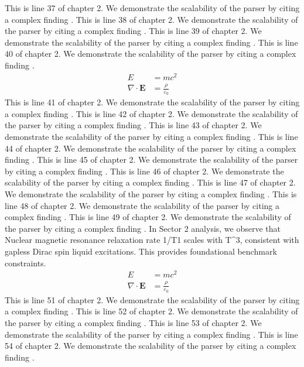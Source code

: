 This is line 37 of chapter 2. We demonstrate the scalability of the parser by citing a complex finding \cite{ref2_37}.
This is line 38 of chapter 2. We demonstrate the scalability of the parser by citing a complex finding \cite{ref2_38}.
This is line 39 of chapter 2. We demonstrate the scalability of the parser by citing a complex finding \cite{ref2_39}.
This is line 40 of chapter 2. We demonstrate the scalability of the parser by citing a complex finding \cite{ref2_40}.
\begin{align*}
  E &= mc^2 \\
  \nabla \cdot \mathbf{E} &= \frac{\rho}{\varepsilon_0}
\end{align*}
This is line 41 of chapter 2. We demonstrate the scalability of the parser by citing a complex finding \cite{ref2_41}.
This is line 42 of chapter 2. We demonstrate the scalability of the parser by citing a complex finding \cite{ref2_42}.
This is line 43 of chapter 2. We demonstrate the scalability of the parser by citing a complex finding \cite{ref2_43}.
This is line 44 of chapter 2. We demonstrate the scalability of the parser by citing a complex finding \cite{ref2_44}.
This is line 45 of chapter 2. We demonstrate the scalability of the parser by citing a complex finding \cite{ref2_45}.
This is line 46 of chapter 2. We demonstrate the scalability of the parser by citing a complex finding \cite{ref2_46}.
This is line 47 of chapter 2. We demonstrate the scalability of the parser by citing a complex finding \cite{ref2_47}.
This is line 48 of chapter 2. We demonstrate the scalability of the parser by citing a complex finding \cite{ref2_48}.
This is line 49 of chapter 2. We demonstrate the scalability of the parser by citing a complex finding \cite{ref2_49}.
In Sector 2 analysis, we observe that Nuclear magnetic resonance relaxation rate 1/T1 scales with T^3, consistent with gapless Dirac spin liquid excitations. This provides foundational benchmark constraints.
\begin{align*}
  E &= mc^2 \\
  \nabla \cdot \mathbf{E} &= \frac{\rho}{\varepsilon_0}
\end{align*}
This is line 51 of chapter 2. We demonstrate the scalability of the parser by citing a complex finding \cite{ref2_51}.
This is line 52 of chapter 2. We demonstrate the scalability of the parser by citing a complex finding \cite{ref2_52}.
This is line 53 of chapter 2. We demonstrate the scalability of the parser by citing a complex finding \cite{ref2_53}.
This is line 54 of chapter 2. We demonstrate the scalability of the parser by citing a complex finding \cite{ref2_54}.
